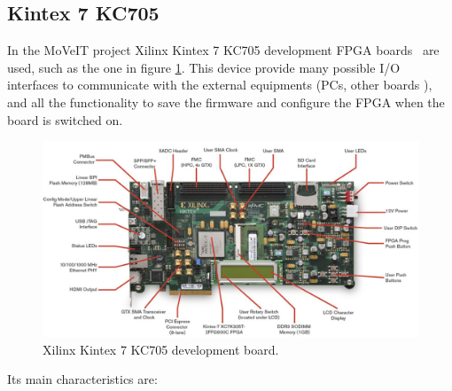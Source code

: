 \subsection{Kintex 7 KC705}
\noindent In the MoVeIT project Xilinx Kintex 7 KC705 development FPGA boards~\cite{kintex7} are used, such as the one in figure \ref{fig:kintex}.
This device provide many possible I/O interfaces to communicate with the external equipments (PCs, other boards ), and all the functionality to save the firmware and configure the FPGA when the board is switched on.
\begin{figure}[H]
	\centering
	\includegraphics[width=0.9\linewidth]{IMG/ch3/KINTEX}
	\caption{Xilinx Kintex 7 KC705 development board.}
	\label{fig:kintex}
\end{figure}
\noindent Its main characteristics are:
